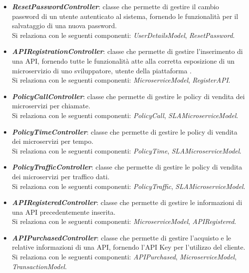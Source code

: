\begin{itemize}
\begin{itemize}
		\item \textbf{\textit{ResetPasswordController}}: classe che permette di gestire il cambio password di un utente autenticato al sistema, fornendo le funzionalità per il salvataggio di una nuova password.\\
		Si relaziona con le seguenti componenti: \textit{UserDetailsModel}, \textit{ResetPassword}.
		
		\item \textbf{\textit{APIRegistrationController}}: classe che permette di gestire l'inserimento di una API, fornendo tutte le funzionalità atte alla corretta esposizione di un microservizio di uno sviluppatore, utente della piattaforma \progetto.\\
		Si relaziona con le seguenti componenti: \textit{MicroserviceModel}, \textit{RegisterAPI}.
				
		\item \textbf{\textit{PolicyCallController}}: classe che permette di gestire le policy di vendita dei microservizi per chiamate.\\
		Si relaziona con le seguenti componenti: \textit{PolicyCall}, \textit{SLAMicroserviceModel}.
		
		\item \textbf{\textit{PolicyTimeController}}: classe che permette di gestire le policy di vendita dei microservizi per tempo.\\
		Si relaziona con le seguenti componenti: \textit{PolicyTime}, \textit{SLAMicroserviceModel}.
		
		\item \textbf{\textit{PolicyTrafficController}}: classe che permette di gestire le policy di vendita dei microservizi per traffico dati.\\
		Si relaziona con le seguenti componenti: \textit{PolicyTraffic}, \textit{SLAMicroserviceModel}.
		
		\item \textbf{\textit{APIRegisteredController}}: classe che permette di gestire le informazioni di una API precedentemente inserita.\\
		Si relaziona con le seguenti componenti: \textit{MicroserviceModel}, \textit{APIRegistered}.
		
		\item \textbf{\textit{APIPurchasedController}}: classe che permette di gestire l'acquisto e le relative informazioni di una API, fornendo l'API Key per l'utilizzo del cliente.\\
		Si relaziona con le seguenti componenti: \textit{APIPurchased}, \textit{MicroserviceModel}, \textit{TransactionModel}.
		

\end{itemize}
\end{itemize}
